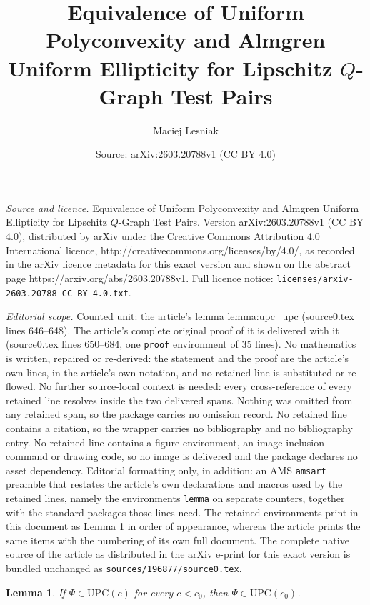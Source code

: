 \documentclass[10pt,a4paper]{amsart}
\title{Equivalence of Uniform Polyconvexity and Almgren Uniform Ellipticity for Lipschitz $Q$-Graph Test Pairs}
\author{Maciej Lesniak}
\date{Source: arXiv:2603.20788v1 (CC BY 4.0)}
\newtheorem{lemma}{Lemma}
\newcommand{\UPC}{\mathrm{UPC}}
\begin{document}
\maketitle

\noindent\emph{Source and licence.} Equivalence of Uniform Polyconvexity and Almgren Uniform Ellipticity for Lipschitz $Q$-Graph Test Pairs. Version arXiv:2603.20788v1 (CC BY 4.0), distributed by arXiv under the Creative Commons Attribution 4.0 International licence, http://creativecommons.org/licenses/by/4.0/, as recorded in the arXiv licence metadata for this exact version and shown on the abstract page https://arxiv.org/abs/2603.20788v1. Full licence notice: \texttt{licenses/arxiv-2603.20788-CC-BY-4.0.txt}.\par\smallskip

\noindent\textit{Editorial scope.} Counted unit: the article's lemma lemma:upc\_upc (source0.tex lines 646--648). The article's complete original proof of it is delivered with it (source0.tex lines 650--684, one \texttt{proof} environment of 35 lines). No mathematics is written, repaired or re-derived: the statement and the proof are the article's own lines, in the article's own notation, and no retained line is substituted or re-flowed.  No further source-local context is needed: every cross-reference of every retained line resolves inside the two delivered spans.  Nothing was omitted from any retained span, so the package carries no omission record.  No retained line contains a citation, so the wrapper carries no bibliography and no bibliography entry.  No retained line contains a figure environment, an image-inclusion command or drawing code, so no image is delivered and the package declares no asset dependency.  Editorial formatting only, in addition: an AMS \texttt{amsart} preamble that restates the article's own declarations and macros used by the retained lines, namely the environments \texttt{lemma} on separate counters, together with the standard packages those lines need.  The retained environments print in this document as Lemma 1 in order of appearance, whereas the article prints the same items with the numbering of its own full document.  The complete native source of the article as distributed in the arXiv e-print for this exact version is bundled unchanged as \texttt{sources/196877/source0.tex}.
\begin{lemma}\label{lemma:upc_upc}
If $\Psi\in\UPC(c)$ for every $c<c_0$, then $\Psi\in\UPC(c_0)$.
\end{lemma}
\end{document}

